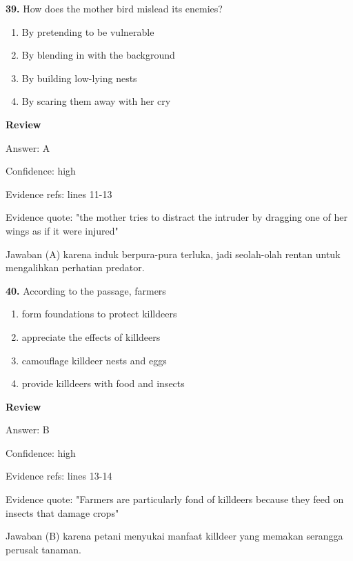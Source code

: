 \documentclass[12pt]{article}
\begin{document}
\endgroup
\par
\vspace{0.25\baselineskip}
\noindent\textbf{39.} How does the mother bird mislead its enemies?
\begin{enumerate}[label=(\Alph*),leftmargin=*,itemsep=0.2em]
\item By pretending to be vulnerable
\item By blending in with the background
\item By building low-lying nests
\item By scaring them away with her cry
\end{enumerate}
\par
\begingroup
\setlength{\parskip}{0pt}
\setlength{\parindent}{0pt}
\textbf{Review}\par
Answer: A\par
Confidence: high\par
Evidence refs: lines 11-13\par
Evidence quote: "the mother tries to distract the intruder by dragging one of her wings as if it were injured"\par
Jawaban (A) karena induk berpura-pura terluka, jadi seolah-olah rentan untuk mengalihkan perhatian predator.\par
\endgroup
\par
\vspace{0.25\baselineskip}
\noindent\textbf{40.} According to the passage, farmers
\begin{enumerate}[label=(\Alph*),leftmargin=*,itemsep=0.2em]
\item form foundations to protect killdeers
\item appreciate the effects of killdeers
\item camouflage killdeer nests and eggs
\item provide killdeers with food and insects
\end{enumerate}
\par
\begingroup
\setlength{\parskip}{0pt}
\setlength{\parindent}{0pt}
\textbf{Review}\par
Answer: B\par
Confidence: high\par
Evidence refs: lines 13-14\par
Evidence quote: "Farmers are particularly fond of killdeers because they feed on insects that damage crops"\par
Jawaban (B) karena petani menyukai manfaat killdeer yang memakan serangga perusak tanaman.\par
\end{document}
